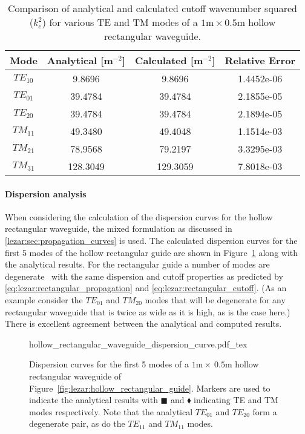 \begin{table}[b]
 \centering
    \caption{Comparison of analytical and calculated cutoff wavenumber squared ($k_c^2$) for various TE and TM modes of a $1\text{m}\times0.5\text{m}$ hollow rectangular waveguide.}
    \label{tab:lezar:rectangular_cutoff_comparison}
    \begin{tabular}{|c|c|c|c|}
    \hline
    Mode & Analytical [m$^{-2}$] & Calculated [m$^{-2}$] & Relative Error \\
    \hline
    $TE_{10}$ & 9.8696 & 9.8696 & 1.4452e-06\\
    $TE_{01}$ & 39.4784 & 39.4784 & 2.1855e-05\\
    $TE_{20}$ & 39.4784 & 39.4784 & 2.1894e-05\\
    \hline
    $TM_{11}$ & 49.3480 & 49.4048 & 1.1514e-03 \\
    $TM_{21}$ & 78.9568 & 79.2197 & 3.3295e-03\\
    $TM_{31}$ & 128.3049 & 129.3059 & 7.8018e-03\\
    \hline
    \end{tabular}
\end{table}

\paragraph{Dispersion analysis}

When considering the calculation of the dispersion curves for the hollow rectangular waveguide, the mixed formulation as discussed in \ref{lezar:sec:propagation_curves} is used.  The calculated dispersion curves for the first 5 modes of the hollow rectangular guide are shown in Figure~\ref{fig:lezar:hollow_rectangular_dispersion_curves} along with the analytical results. For the rectangular guide a number of modes are degenerate~\cite[see][Chapter 10]{Davidson2011} with the same dispersion and cutoff properties as predicted by \eqref{eq:lezar:rectangular_propagation} and \eqref{eq:lezar:rectangular_cutoff}. (As an example consider the $TE_{01}$ and $TM_{20}$ modes that will be degenerate for any rectangular waveguide that is twice as wide as it is high, as is the case here.) There is excellent agreement between the analytical and computed results.
\begin{figure}
  \centering
    \def\svgwidth{\largefig}
  {hollow_rectangular_waveguide_dispersion_curve.pdf_tex}
  \caption{Dispersion curves for the first 5 modes of a $1\text{m}\times~0.5\text{m}$ hollow rectangular waveguide of Figure~\ref{fig:lezar:hollow_rectangular_guide}. Markers are used to indicate the analytical results with $\blacksquare$ and $\blacklozenge$ indicating TE and TM modes respectively. Note that the analytical $TE_{01}$ and $TE_{20}$ form a degenerate pair, as do the $TE_{11}$ and $TM_{11}$ modes.}
  \label{fig:lezar:hollow_rectangular_dispersion_curves}
\end{figure}

